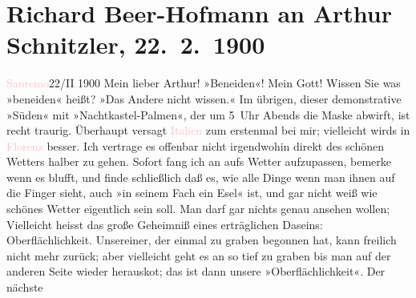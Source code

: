 

               \section[Richard Beer-Hofmann an Arthur Schnitzler, 22. 2. 1900]{ Richard Beer-Hofmann an Arthur Schnitzler, 22. 2. 1900}\nopagebreak{}\rehead{ }\normalsize\beginnumbering{} \toendnotes[C]{\smallbreak\pagebreak[2]} 
\toendnotes[C]{\smallbreak}\pstart
           \raggedleft{}{\pb}\textcolor{pink}{Sanremo}{}\ledrightnote{\textcolor{pink}{Sanremo}}{ }22/II 1900\pend
           \pstart
           Mein lieber Arthur! »Beneiden«! Mein Gott! Wissen Sie was »beneiden«
               heißt? »Das Andere nicht wissen.« Im übrigen, dieser demonstrative »Süden« mit
               »Nachtkastel-Palmen«, der um 5 Uhr Abends die Maske abwirft, ist recht traurig.
               Überhaupt versagt \textcolor{pink}{Italien}{}\ledrightnote{\textcolor{pink}{Italien}} zum erstenmal bei mir;
               vielleicht wirds in \textcolor{pink}{Florenz}{}\ledrightnote{\textcolor{pink}{Florenz}} besser. Ich vertrage es
               offenbar nicht irgendwohin direkt des schönen Wetters halber zu gehen. Sofort fang
               ich an aufs Wetter aufzupassen, bemerke wenn es blufft, und finde schließlich daß es,
               wie alle Dinge wenn man ihnen auf die Finger sieht, auch »in seinem Fach ein Esel«
               ist, und gar nicht weiß wie schönes Wetter eigentlich sein soll. Man darf gar nichts
               genau ansehen wollen; {\pb}Vielleicht
               heisst das große Geheimniß eines erträglichen Daseins: Oberflächlichkeit. Unsereiner,
               der einmal zu graben begonnen hat, kann freilich nicht mehr zurück; aber vielleicht
               geht es an so tief zu graben bis man auf der anderen Seite wieder herausko{\geminationm}t; das ist dann unsere »Oberflächlichkeit«. Der nächste
